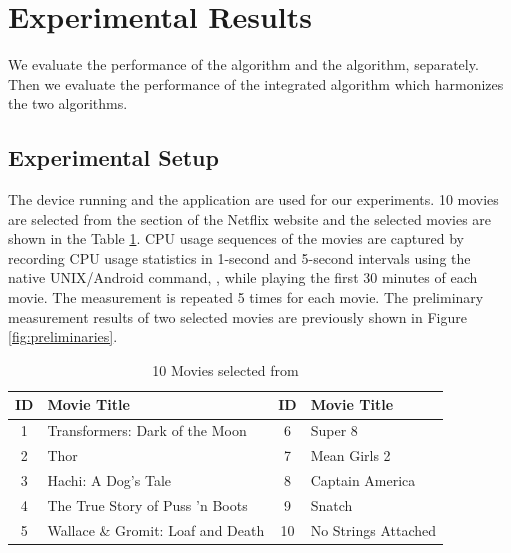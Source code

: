 \section{Experimental Results}
\label{sec:experiments}

We evaluate the performance of the  algorithm and the  algorithm, separately.
Then we evaluate the performance of the integrated algorithm which harmonizes the two algorithms. 

\subsection{Experimental Setup}
\label{sec:experimental_setup}

The  device running  and the  application are used for our experiments. 
10 movies are selected from the  section of the Netflix website and the selected movies are shown in the Table \ref{tab:movies}.
CPU usage sequences of the movies are captured by recording CPU usage statistics in 1-second and 5-second intervals using the native UNIX/Android command, , while playing the first 30 minutes of each movie. 
The measurement is repeated 5 times for each movie.
The preliminary measurement results of two selected movies are previously shown in Figure \ref{fig:preliminaries}.

\begin{table}[h!]
\begin{center}
\begin{tabular}{|c | m{5cm} ||c| m{5cm}|}
\hline
ID & Movie Title & ID & Movie Title \\ 
\hline
1 & Transformers: Dark of the Moon 		& 6 & Super 8\\
2 & Thor					& 7 & Mean Girls 2 \\
3 & Hachi: A Dog's Tale 			& 8 & Captain America \\
4 & The True Story of Puss 'n Boots 		& 9 &  Snatch \\
5 & Wallace \& Gromit: Loaf and Death 	& 10 & No Strings Attached \\
\hline
\end{tabular}
\end{center}
\caption{10 Movies selected from }
\label{tab:movies}
\end{table}

